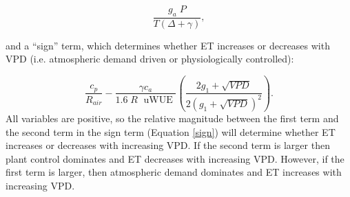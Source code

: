 \documentclass[draft,linenumbers]{agujournal}
\begin{document}
\begin{equation}
  \frac{g_a \; P}{T(\Delta + \gamma)},
\end{equation}

and a ``sign'' term, which determines whether ET increases or decreases with VPD (i.e. atmospheric demand driven or physiologically controlled):

\begin{equation}
  \label{sign}
  \frac{c_p}{R_{air}} - \frac{\gamma c_a }{1.6 \; R\; \text{ uWUE }} \left( \frac{2 g_1 + \sqrt{VPD}}{2 (g_1 + \sqrt{VPD})^2}\right).
\end{equation}
All variables are positive, so the relative magnitude between the first term and the second term in the sign term (Equation \ref{sign}) will determine whether ET increases or decreases with increasing VPD. If the second term is larger then plant control dominates and ET decreases with increasing VPD. However, if the first term is larger, then atmospheric demand dominates and ET increases with increasing VPD. 
\end{document}
